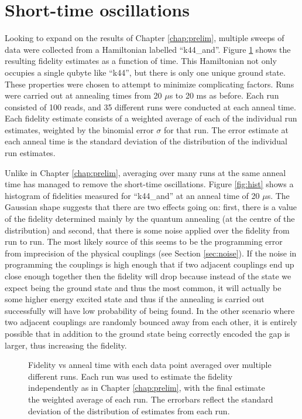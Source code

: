 \section{Short-time oscillations}
Looking to expand on the results of Chapter \ref{chap:prelim}, multiple sweeps of data were collected from a Hamiltonian labelled ``k44\_and''.  Figure \ref{fig:results_avg} shows the resulting fidelity estimates as a function of time.  This Hamiltonian not only occupies a single qubyte like ``k44'', but there is only one unique ground state.  These properties were chosen to attempt to minimize complicating factors.  Runs were carried out at annealing times from 20 $\mu$s to 20 ms as before.  Each run consisted of 100 reads, and 35 different runs were conducted at each anneal time.  Each fidelity estimate consists of a weighted average of each of the individual run estimates, weighted by the binomial error $\sigma$ for that run.
The error estimate at each anneal time is the standard deviation of the distribution of the individual run estimates.

Unlike in Chapter \ref{chap:prelim}, averaging over many runs at the same anneal time has managed to remove the short-time oscillations.  Figure \ref{fig:hist} shows a histogram of fidelities measured for ``k44\_and'' at an anneal time of 20 $\mu$s.  The Gaussian shape suggests that there are two effects going on: first, there is a value of the fidelity determined mainly by the quantum annealing (at the centre of the distribution) and second, that there is some noise applied over the fidelity from run to run.  The most likely source of this seems to be the programming error from imprecision of the physical couplings (see Section \ref{sec:noise}).  If the noise in programming the couplings is high enough that if two adjacent couplings end up close enough together then the fidelity will drop because instead of the state we expect being the ground state and thus the most common, it will actually be some higher energy excited state and thus if the annealing is carried out successfully will have low probability of being found.  In the other scenario where two adjacent couplings are randomly bounced away from each other, it is entirely possible that in addition to the ground state being correctly encoded the gap is larger, thus increasing the fidelity.

\begin{figure}
	\caption[Averaged Anneal Results]{Fidelity vs anneal time with each data point averaged over multiple different runs.  Each run was used to estimate the fidelity independently as in Chapter \ref{chap:prelim}, with the final estimate the weighted average of each run.  The errorbars reflect the standard deviation of the distribution of estimates from each run.}
	\label{fig:results_avg}
\end{figure}

